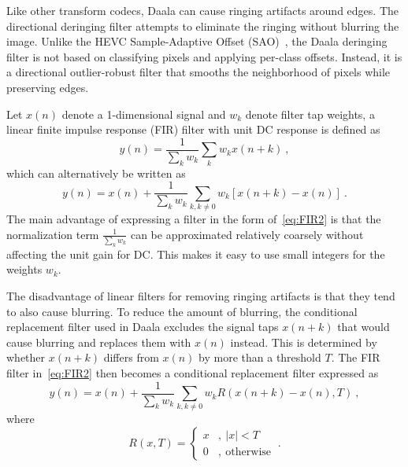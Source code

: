 \documentclass[english,conference,10pt]{IEEEtran}
\begin{document}
Like other transform codecs, Daala can cause ringing artifacts around edges.
The directional deringing filter attempts to eliminate the ringing without
blurring the image. Unlike the HEVC Sample-Adaptive Offset (SAO)~\cite{HEVC-SAO},
the Daala deringing filter is not based on classifying pixels and applying per-class
offsets. Instead, it is a directional outlier-robust filter that smooths the
neighborhood of pixels while preserving edges.

Let $x\left(n\right)$ denote a 1-dimensional signal and $w_{k}$
denote filter tap weights, a linear finite impulse response (FIR)
filter with unit DC response is defined as
\begin{equation}
y\left(n\right)=\frac{1}{\sum_{k}w_{k}}\sum_{k}w_{k}x\left(n+k\right)\ ,\label{eq:FIR1}
\end{equation}
which can alternatively be written as
\begin{equation}
y\left(n\right)=x\left(n\right)+\frac{1}{\sum_{k}w_{k}}\sum_{k,k\neq0}w_{k}\left[x\left(n+k\right)-x\left(n\right)\right]\ .\label{eq:FIR2}
\end{equation}
The main advantage of expressing a filter in the form of~\cref{eq:FIR2}
is that the normalization term $\frac{1}{\sum_{k}w_{k}}$ can be approximated
relatively coarsely without affecting the unit gain for DC. This makes
it easy to use small integers for the weights $w_{k}$.

The disadvantage of linear filters for removing ringing artifacts
is that they tend to also cause blurring. To reduce the amount of
blurring, the conditional replacement filter used in Daala excludes
the signal taps $x\left(n+k\right)$ that would cause blurring and
replaces them with $x\left(n\right)$ instead. This is determined
by whether $x\left(n+k\right)$ differs from $x\left(n\right)$ by
more than a threshold $T$. The FIR filter in~\cref{eq:FIR2}
then becomes a conditional replacement filter expressed as
\begin{equation}
y\left(n\right)=x\left(n\right)+\frac{1}{\sum_{k}w_{k}}\sum_{k,k\neq0}w_{k}R\left(x\left(n+k\right)-x\left(n\right),T\right)\ ,\label{eq:CRF}
\end{equation}
where
\begin{equation}
R\left(x,T\right)=\left\{ \begin{array}{ll}
x & ,\ \left|x\right|<T\\
0 & ,\ \mathrm{otherwise}
\end{array}\right.\ .
\end{equation}
\end{document}
